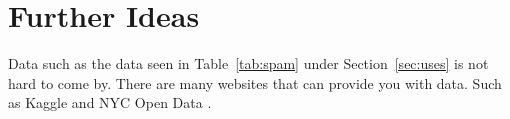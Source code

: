 \documentclass[12pt]{article}
\begin{document}
\section{Further Ideas}
\label{sec:furtherideas}
Data such as the data seen in Table~\ref{tab:spam} under Section~\ref{sec:uses} is not 
hard to come by. There are many websites that can provide you with data. Such as Kaggle \citep{kaggle_datasets} and NYC Open Data \citet{nyc_open_data}.



\typeout{}
\end{document}
